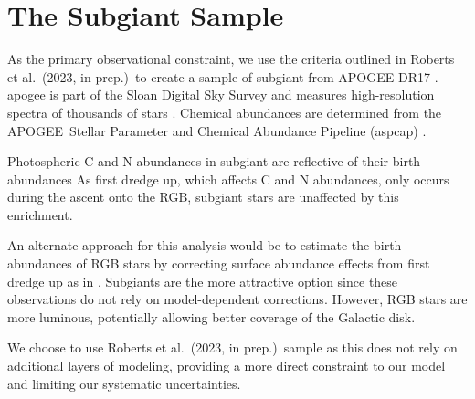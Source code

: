\documentclass[fleqn,usenatbib]{mnras}
\newcommand{\citetjack}{Roberts et al.~(2023, in prep.)}
\newcommand{\apogee}{APOGEE}
\begin{document}





\appendix


\section{The Subgiant Sample}\label{sec:jack}

As the primary observational constraint, we use the criteria outlined in \citetjack~to create a sample of subgiant from \apogee{} DR17 \citep{apogee17}. apogee is part of the Sloan Digital Sky Survey and measures high-resolution spectra of thousands of stars \cite{sdss17}. Chemical abundances are determined from the \apogee\ Stellar Parameter and Chemical Abundance Pipeline ({\sc aspcap}) \citep{aspcap}.  


Photospheric C and N abundances in subgiant are reflective of their birth abundances \citep{gilroy89, korn+07, lind+08, souto+18, souto19} As first dredge up, which affects C and N abundances, only occurs during the ascent onto the RGB, subgiant stars are unaffected by this enrichment. 

An alternate approach for this analysis would be to estimate the birth abundances of RGB stars by correcting surface abundance effects from first dredge up as in \cite{vincenzo+21}. Subgiants are the more attractive option since these observations do not rely on model-dependent corrections. However, RGB stars are more luminous, potentially allowing better coverage of the Galactic disk.


We choose to use \citetjack\ sample as this does not rely on additional layers of modeling, providing a more direct constraint to our model and limiting our systematic uncertainties.
\end{document}
